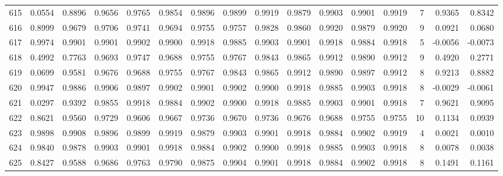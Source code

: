 \begin{tabular}{lrrrrrrrrrrrrrrr}
615 &      0.0554 &  0.8896 &  0.9656 &  0.9765 &  0.9854 &  0.9896 &  0.9899 &  0.9919 &  0.9879 &  0.9903 &   0.9901 &     0.9919 &      7 &                    0.9365 &                     0.8342 \\
616 &      0.8999 &  0.9679 &  0.9706 &  0.9741 &  0.9694 &  0.9755 &  0.9757 &  0.9828 &  0.9860 &  0.9920 &   0.9879 &     0.9920 &      9 &                    0.0921 &                     0.0680 \\
617 &      0.9974 &  0.9901 &  0.9901 &  0.9902 &  0.9900 &  0.9918 &  0.9885 &  0.9903 &  0.9901 &  0.9918 &   0.9884 &     0.9918 &      5 &                   -0.0056 &                    -0.0073 \\
618 &      0.4992 &  0.7763 &  0.9693 &  0.9747 &  0.9688 &  0.9755 &  0.9767 &  0.9843 &  0.9865 &  0.9912 &   0.9890 &     0.9912 &      9 &                    0.4920 &                     0.2771 \\
619 &      0.0699 &  0.9581 &  0.9676 &  0.9688 &  0.9755 &  0.9767 &  0.9843 &  0.9865 &  0.9912 &  0.9890 &   0.9897 &     0.9912 &      8 &                    0.9213 &                     0.8882 \\
620 &      0.9947 &  0.9886 &  0.9906 &  0.9897 &  0.9902 &  0.9901 &  0.9902 &  0.9900 &  0.9918 &  0.9885 &   0.9903 &     0.9918 &      8 &                   -0.0029 &                    -0.0061 \\
621 &      0.0297 &  0.9392 &  0.9855 &  0.9918 &  0.9884 &  0.9902 &  0.9900 &  0.9918 &  0.9885 &  0.9903 &   0.9901 &     0.9918 &      7 &                    0.9621 &                     0.9095 \\
622 &      0.8621 &  0.9560 &  0.9729 &  0.9606 &  0.9667 &  0.9736 &  0.9670 &  0.9736 &  0.9676 &  0.9688 &   0.9755 &     0.9755 &     10 &                    0.1134 &                     0.0939 \\
623 &      0.9898 &  0.9908 &  0.9896 &  0.9899 &  0.9919 &  0.9879 &  0.9903 &  0.9901 &  0.9918 &  0.9884 &   0.9902 &     0.9919 &      4 &                    0.0021 &                     0.0010 \\
624 &      0.9840 &  0.9878 &  0.9903 &  0.9901 &  0.9918 &  0.9884 &  0.9902 &  0.9900 &  0.9918 &  0.9885 &   0.9903 &     0.9918 &      8 &                    0.0078 &                     0.0038 \\
625 &      0.8427 &  0.9588 &  0.9686 &  0.9763 &  0.9790 &  0.9875 &  0.9904 &  0.9901 &  0.9918 &  0.9884 &   0.9902 &     0.9918 &      8 &                    0.1491 &                     0.1161 \\

\end{tabular}

